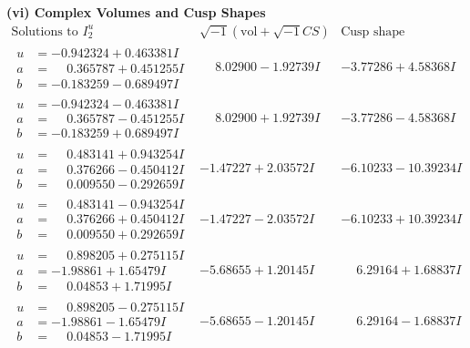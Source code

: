 \documentclass[1p]{elsarticle_modified}
\theoremstyle{definition}
\newcommand{\I}{\sqrt{-1}}
\begin{document}
\newpage\flushleft \textbf{(vi) Complex Volumes and Cusp Shapes}
$$\begin{array}{c|c|c}  
\text{Solutions to }I^u_{2}& \I (\text{vol} + \sqrt{-1}CS) & \text{Cusp shape}\\
 \hline 
\begin{aligned}
u &= -0.942324 + 0.463381 I \\
a &= \phantom{-}0.365787 + 0.451255 I \\
b &= -0.183259 - 0.689497 I\end{aligned}
 & \phantom{-}8.02900 - 1.92739 I & -3.77286 + 4.58368 I \\ \hline\begin{aligned}
u &= -0.942324 - 0.463381 I \\
a &= \phantom{-}0.365787 - 0.451255 I \\
b &= -0.183259 + 0.689497 I\end{aligned}
 & \phantom{-}8.02900 + 1.92739 I & -3.77286 - 4.58368 I \\ \hline\begin{aligned}
u &= \phantom{-}0.483141 + 0.943254 I \\
a &= \phantom{-}0.376266 - 0.450412 I \\
b &= \phantom{-}0.009550 - 0.292659 I\end{aligned}
 & -1.47227 + 2.03572 I & -6.10233 - 10.39234 I \\ \hline\begin{aligned}
u &= \phantom{-}0.483141 - 0.943254 I \\
a &= \phantom{-}0.376266 + 0.450412 I \\
b &= \phantom{-}0.009550 + 0.292659 I\end{aligned}
 & -1.47227 - 2.03572 I & -6.10233 + 10.39234 I \\ \hline\begin{aligned}
u &= \phantom{-}0.898205 + 0.275115 I \\
a &= -1.98861 + 1.65479 I \\
b &= \phantom{-}0.04853 + 1.71995 I\end{aligned}
 & -5.68655 + 1.20145 I & \phantom{-}6.29164 + 1.68837 I \\ \hline\begin{aligned}
u &= \phantom{-}0.898205 - 0.275115 I \\
a &= -1.98861 - 1.65479 I \\
b &= \phantom{-}0.04853 - 1.71995 I\end{aligned}
 & -5.68655 - 1.20145 I & \phantom{-}6.29164 - 1.68837 I \\ \hline\begin{aligned}

\end{aligned}
\end{array}$$
\end{document}
